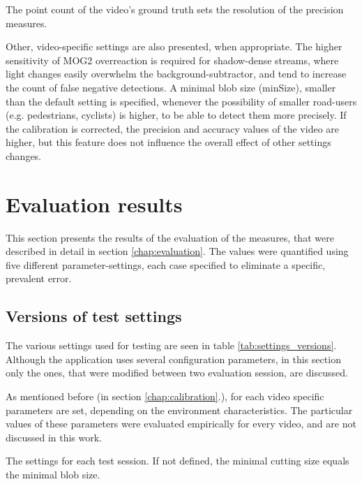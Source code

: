 The point count of the video's ground truth sets the resolution of the precision measures.

Other, video-specific settings are also presented, when appropriate.
The higher sensitivity of MOG2 overreaction is required for shadow-dense streams, where light changes easily overwhelm the background-subtractor, and tend to increase the count of false negative detections.
A minimal blob size (minSize), smaller than the default setting is specified, whenever the possibility of smaller road-users (e.g. pedestrians, cyclists) is higher, to be able to detect them more precisely.
If the calibration is corrected, the precision and accuracy values of the video are higher, but this feature does not influence the overall effect of other settings changes. 
\FloatBarrier

\section{Evaluation results}\label{sec:evaluation_results}
This section presents the results of the evaluation of the measures, that were described in detail in section \ref{chap:evaluation}.
The values were quantified using five different parameter-settings, each case specified to eliminate a specific, prevalent error.

\subsection{Versions of test settings}
The various settings used for testing are seen in table \ref{tab:settings_versions}.
Although the application uses several configuration parameters, in this section only the ones, that were modified between two evaluation session, are discussed.

As mentioned before (in section \ref{chap:calibration}.), for each video specific parameters are set, depending on the environment characteristics.
The particular values of these parameters were evaluated empirically for every video, and are not discussed in this work.

\begin{table}[!h]
	\begin{adjustbox}{center}
	\end{adjustbox}
	\caption{The settings for each test session. If not defined, the minimal cutting size equals the minimal blob size.}
	\label{tab:settings_versions}
\end{table}

